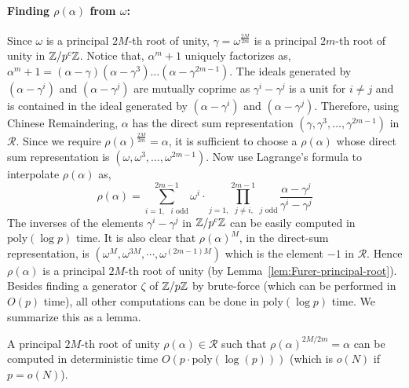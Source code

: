 \documentclass[11pt]{article}
\renewcommand{\R}{\mathcal{R}} %
\begin{document}
\paragraph{Finding $\rho(\alpha)$ from $\omega$:} Since $\omega$ is a
principal $2M$-th root of unity, $\gamma = \omega^{\frac{2M}{2m}}$ is
a principal $2m$-th root of unity in $\mathbb{Z}/p^c\mathbb{Z}$. Notice that,
$\alpha^m + 1$ uniquely factorizes as, $\alpha^m + 1 = (\alpha -
\gamma)(\alpha - \gamma^3) \ldots (\alpha - \gamma^{2m-1})$. The
ideals generated by $(\alpha - \gamma^i)$ and $(\alpha - \gamma^j)$
are mutually coprime as $\gamma^i -\gamma^j$ is a unit for $i\neq j$
and is contained in the ideal generated by $(\alpha - \gamma^i)$ and
$(\alpha - \gamma^j)$.  Therefore, using Chinese Remaindering,
$\alpha$ has the direct sum representation $(\gamma, \gamma^3, \ldots,
\gamma^{2m-1})$ in $\mathcal{R}$. Since we require
$\rho(\alpha)^{\frac{2M}{2m}} = \alpha$, it is sufficient to choose a
$\rho(\alpha)$ whose direct sum representation is $(\omega, \omega^3,
\ldots, \omega^{2m-1})$. Now use Lagrange's formula to interpolate
$\rho(\alpha)$ as,
\begin{equation*}
  \rho(\alpha) = \sum_{i=1, \text{ } i \text{ odd}}^{2m-1}{\omega^i \cdot \prod_{j=1, \text{ } j \neq i, \text{ } j \text{ odd}}^{2m-1}{\frac{\alpha - \gamma^j}{\gamma^i - \gamma^j}}}
\end{equation*}
The inverses of the elements $\gamma^i - \gamma^j$ in $\mathbb{Z}/p^c\mathbb{Z}$ can
be easily computed in $\text{poly}(\log p)$ time. It is also clear
that $\rho(\alpha)^M$, in the direct-sum representation, is
$(\omega^M, \omega^{3M}, \cdots, \omega^{(2m -1)M})$ which is the element $-1$
in $\R$. Hence $\rho(\alpha)$ is
a principal $2M$-th root of unity (by Lemma~\ref{lem:Furer-principal-root}).\\

Besides finding a generator $\zeta$ of $\mathbb{Z}/p\mathbb{Z}$ by brute-force (which
can be performed in $O(p)$ time), all other computations can be done
in $\text{poly}(\log p)$ time. We summarize this as a lemma.

\begin{lemma}\label{lem:root-time}
  A principal $2M$-th root of unity $\rho(\alpha)\in \R$ such that
  $\rho(\alpha)^{2M/2m} = \alpha$ can be computed in deterministic
  time $O(p \cdot \mathrm{poly}(\log(p)))$ (which is $o(N)$ if $p =
  o(N)$).
\end{lemma}

\end{document}
